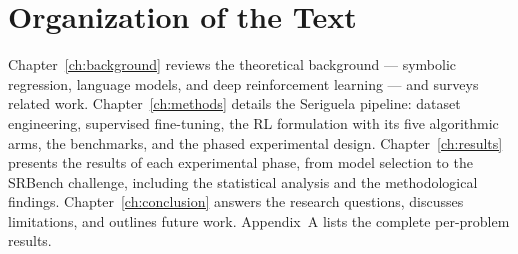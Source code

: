 \section{Organization of the Text}

Chapter~\ref{ch:background} reviews the theoretical background --- symbolic regression, language models, and deep reinforcement learning --- and surveys related work. Chapter~\ref{ch:methods} details the Seriguela pipeline: dataset engineering, supervised fine-tuning, the RL formulation with its five algorithmic arms, the benchmarks, and the phased experimental design. Chapter~\ref{ch:results} presents the results of each experimental phase, from model selection to the SRBench challenge, including the statistical analysis and the methodological findings. Chapter~\ref{ch:conclusion} answers the research questions, discusses limitations, and outlines future work. Appendix~A lists the complete per-problem results.
